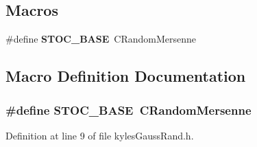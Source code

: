 \subsection*{Macros}
\begin{DoxyCompactItemize}
\item 
\#define {\bf S\-T\-O\-C\-\_\-\-B\-A\-S\-E}~C\-Random\-Mersenne
\end{DoxyCompactItemize}


\subsection{Macro Definition Documentation}
\subsubsection[{S\-T\-O\-C\-\_\-\-B\-A\-S\-E}]{\setlength{\rightskip}{0pt plus 5cm}\#define S\-T\-O\-C\-\_\-\-B\-A\-S\-E~C\-Random\-Mersenne}\label{kyles_gauss_rand_8h_ae92ade333504bafa01e6ee3a8945eb64}


Definition at line 9 of file kyles\-Gauss\-Rand.\-h.

